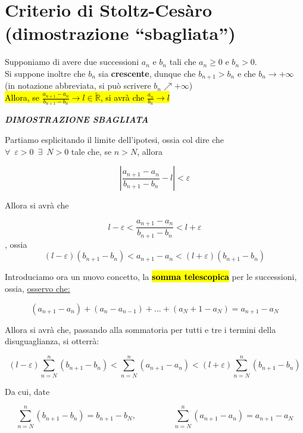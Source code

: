 \documentclass{article}
\theoremstyle{definition}
\newcommand{\virgolette}[1]{``#1''}
\begin{document}
\section{Criterio di Stoltz-Cesàro (dimostrazione \virgolette{sbagliata})}
Supponiamo di avere due successioni $a_n$ e $b_n$ tali che $a_n \geqslant 0$ e $b_n >0$.
\\
Si suppone inoltre che $b_n$ sia \textbf{crescente}, dunque che $b_{n+1}>b_n$ e che $b_n \longrightarrow+\infty$ (in notazione abbreviata, si può scrivere $b_n \nearrow +\infty$)
\\
\hl{Allora, se $\frac{a_{n+1}-a_n}{b_{n+1}-b_n}\longrightarrow l \in \widetilde{\mathbb{R}}$, si avrà che $\frac{a_n}{b_n}\longrightarrow l$}
\begin{center}
    \textbf{\textit{DIMOSTRAZIONE SBAGLIATA}}
\end{center}
    Partiamo esplicitando il limite dell'ipotesi, ossia col dire che
    \\
        $\forall \,\,\, \varepsilon>0 \,\,\, \exists \,\,\, N>0$ tale che, se $n>N$, allora
        \begin{center}
\[|\frac{a_{n+1}-a_n}{b_{n+1}-b_n} - l|<\varepsilon\]
        \end{center}
        Allora si avrà che
        \begin{center}
            \[l-\varepsilon<\frac{a_{n+1}-a_n}{b_{n+1}-b_n}<l+\varepsilon\], ossia
            \\
            \[(l-\varepsilon)(b_{n+1}-b_n)<a_{n+1}-a_n<(l+\varepsilon)(b_{n+1}-b_n)\]
        \end{center}
        Introduciamo ora un nuovo concetto, la \hl{\textbf{somma telescopica}} per le successioni, ossia, \underline{osservo che:}
        \begin{center}
            \[(a_{n+1}-a_n)+(a_n-a_{n-1})+...+(a_N+1-a_N)=a_{n+1}-a_N\]
        \end{center}
        Allora si avrà che, passando alla sommatoria per tutti e tre i termini della disuguaglianza, si otterrà:
        \begin{center}
            \[(l-\varepsilon)\sum_{n=N}^{n}(b_{n+1}-b_n)<\sum_{n=N}^{n}(a_{n+1}-a_n)<(l+\varepsilon)\sum_{n=N}^{n}(b_{n+1}-b_n)\]
        \end{center}
        Da cui, date
        \begin{center}
            \[\sum_{n=N}^{n}(b_{n+1}-b_n)=b_{n+1}-b_N, \,\,\,\,\,\,\,\,\,\,\,\,\,\,\,\,\,\,\,\,\,\,\,\,\,\,\,\sum_{n=N}^{n}(a_{n+1}-a_n)=a_{n+1}-a_N\]
        \end{center}
\end{document}
